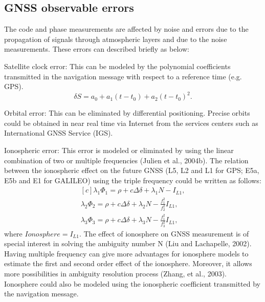 \subsection{GNSS observable errors}
The code and phase measurements are affected by noise and errors due to the propagation of
signals through atmospheric layers and due to the noise measurements. These errors can
described briefly as below:

Satellite clock error: This can be modeled by the polynomial coefficients transmitted in the
navigation message with respect to a reference time (e.g. GPS).
\begin{equation}
	\label{equ:sat_clock_error}
	\delta S = a_{0} + a_{1}(t-t_{0}) + a_{2}(t- t_{0} )^{2}.
\end{equation}

Orbital error: This can be eliminated by differential positioning. Precise orbits could be
obtained in near real time via Internet from the services centers such as International GNSS
Service (IGS).

Ionospheric error: This error is modeled or eliminated by using the linear combination of two
or multiple frequencies (Julien et al., 2004b). The relation between the ionospheric effect on the
future GNSS (L5, L2 and L1 for GPS; E5a, E5b and E1 for GALILEO) using the triple
frequency could be written as follows:
\begin{equation}
	\label{equ:ionospheric_error}
	\begin{aligned}[c]
		\lambda_{1} \Phi_{1} = \rho + c \Delta \delta + \lambda_{1} N - I_{L1},\\
		\lambda_{2}\Phi_{2} = \rho + c \Delta \delta + \lambda_{2} N - 
		\frac{f_{1}^{2}}{f_{2}^{2}}I_{L1},\\
		\lambda_{3}\Phi_{3} = \rho + c \Delta \delta + \lambda_{3} N - 
		\frac{f_{1}^{2}}{f_{3}^{2}}I_{L1},
	\end{aligned}
\end{equation}
where $Ionosphere = I_{L1}$.
The effect of ionosphere on GNSS measurement is of special interest in solving the ambiguity
number N (Liu and Lachapelle, 2002). Having multiple frequency can give more advantages for
ionosphere models to estimate the first and second order effect of the ionosphere. Moreover, it
allows more possibilities in ambiguity resolution process (Zhang, et al., 2003). Ionosphere could
also be modeled using the ionospheric coefficient transmitted by the navigation message.


